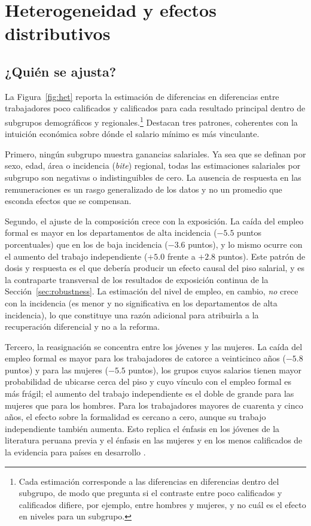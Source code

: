 \section{Heterogeneidad y efectos distributivos}\label{sec:heterogeneity}

\subsection{¿Quién se ajusta?}

La Figura~\ref{fig:het} reporta la estimación de diferencias en diferencias entre trabajadores poco calificados y calificados para cada resultado principal dentro de subgrupos demográficos y regionales.\footnote{Cada estimación corresponde a las diferencias en diferencias dentro del subgrupo, de modo que pregunta si el contraste entre poco calificados y calificados difiere, por ejemplo, entre hombres y mujeres, y no cuál es el efecto en niveles para un subgrupo.} Destacan tres patrones, coherentes con la intuición económica sobre dónde el salario mínimo es más vinculante.

Primero, ningún subgrupo muestra ganancias salariales. Ya sea que se definan por sexo, edad, área o incidencia (\emph{bite}) regional, todas las estimaciones salariales por subgrupo son negativas o indistinguibles de cero. La ausencia de respuesta en las remuneraciones es un rasgo generalizado de los datos y no un promedio que esconda efectos que se compensan.

Segundo, el ajuste de la composición crece con la exposición. La caída del empleo formal es mayor en los departamentos de alta incidencia ($-5.5$ puntos porcentuales) que en los de baja incidencia ($-3.6$ puntos), y lo mismo ocurre con el aumento del trabajo independiente ($+5.0$ frente a $+2.8$ puntos). Este patrón de dosis y respuesta es el que debería producir un efecto causal del piso salarial, y es la contraparte transversal de los resultados de exposición continua de la Sección~\ref{sec:robustness}. La estimación del nivel de empleo, en cambio, \emph{no} crece con la incidencia (es menor y no significativa en los departamentos de alta incidencia), lo que constituye una razón adicional para atribuirla a la recuperación diferencial y no a la reforma.

Tercero, la reasignación se concentra entre los jóvenes y las mujeres. La caída del empleo formal es mayor para los trabajadores de catorce a veinticinco años ($-5.8$ puntos) y para las mujeres ($-5.5$ puntos), los grupos cuyos salarios tienen mayor probabilidad de ubicarse cerca del piso y cuyo vínculo con el empleo formal es más frágil; el aumento del trabajo independiente es el doble de grande para las mujeres que para los hombres. Para los trabajadores mayores de cuarenta y cinco años, el efecto sobre la formalidad es cercano a cero, aunque su trabajo independiente también aumenta. Esto replica el énfasis en los jóvenes de la literatura peruana previa \citep{cespedes_2005, jaramillo_lopez_2006} y el énfasis en las mujeres y en los menos calificados de la evidencia para países en desarrollo \citep{katzkowicz_2021_uruguay, lemos_2009}.

